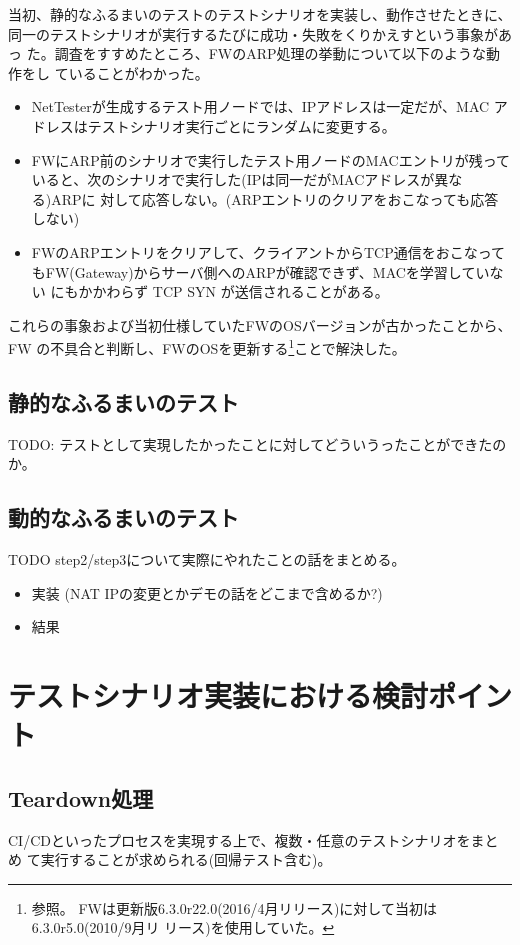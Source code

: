 当初、静的なふるまいのテストのテストシナリオを実装し、動作させたときに、
同一のテストシナリオが実行するたびに成功・失敗をくりかえすという事象があっ
た。調査をすすめたところ、FWのARP処理の挙動について以下のような動作をし
ていることがわかった。
\begin{itemize}
 \item NetTesterが生成するテスト用ノードでは、IPアドレスは一定だが、MAC
       アドレスはテストシナリオ実行ごとにランダムに変更する。
 \item FWにARP前のシナリオで実行したテスト用ノードのMACエントリが残って
       いると、次のシナリオで実行した(IPは同一だがMACアドレスが異なる)ARPに
       対して応答しない。(ARPエントリのクリアをおこなっても応答しない)
 \item FWのARPエントリをクリアして、クライアントからTCP通信をおこなって
       もFW(Gateway)からサーバ側へのARPが確認できず、MACを学習していない
       にもかかわらず TCP SYN が送信されることがある。
\end{itemize}

これらの事象および当初仕様していたFWのOSバージョンが古かったことから、FW
の不具合と判断し、FWのOSを更新する\footnote{参照。
FWは更新版6.3.0r22.0(2016/4月リリース)に対して当初は6.3.0r5.0(2010/9月リ
リース)を使用していた\cite{screenos-releases}。}ことで解決した。

  \subsection{静的なふるまいのテスト}
TODO: テストとして実現したかったことに対してどういうったことができたのか。

  \subsection{動的なふるまいのテスト}
TODO
step2/step3について実際にやれたことの話をまとめる。
\begin{itemize}
 \item 実装 (NAT IPの変更とかデモの話をどこまで含めるか?)
 \item 結果
\end{itemize}

 \section{テストシナリオ実装における検討ポイント}

  \subsection{Teardown処理}
CI/CDといったプロセスを実現する上で、複数・任意のテストシナリオをまとめ
て実行することが求められる(回帰テスト含む)。

